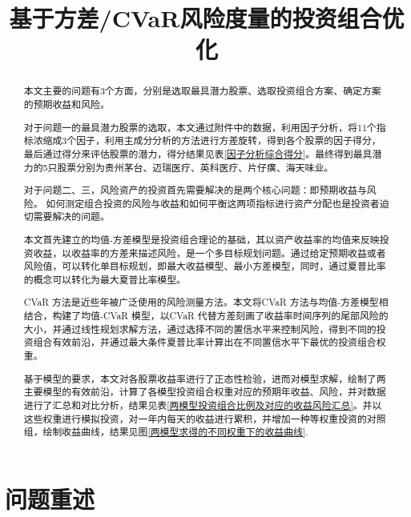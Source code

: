 \documentclass[withoutpreface,bwprint]{cumcmthesis} %
\title{基于方差/CVaR风险度量的投资组合优化}
\begin{document}
	
	\maketitle

	\begin{abstract}
		本文主要的问题有3个方面，分别是选取最具潜力股票、选取投资组合方案、确定方案的预期收益和风险。
		
		对于问题一的最具潜力股票的选取，本文通过附件中的数据，利用因子分析，将11个指标浓缩成3个因子，利用主成分分析的方法进行方差旋转，得到各个股票的因子得分，最后通过得分来评估股票的潜力，得分结果见表\ref{因子分析综合得分}。最终得到最具潜力的5只股票分别为贵州茅台、迈瑞医疗、英科医疗、片仔癀、海天味业。
		
		对于问题二、三，风险资产的投资首先需要解决的是两个核心问题：即预期收益与风险。 如何测定组合投资的风险与收益和如何平衡这两项指标进行资产分配也是投资者迫切需要解决的问题。
		
		本文首先建立的均值-方差模型是投资组合理论的基础，其以资产收益率的均值来反映投资收益，以收益率的方差来描述风险，是一个多目标规划问题。通过给定预期收益或者风险值，可以转化单目标规划，即最大收益模型、最小方差模型，同时，通过夏普比率的概念可以转化为最大夏普比率模型。
		
		CVaR 方法是近些年被广泛使用的风险测量方法。本文将CVaR 方法与均值-方差模型相结合，构建了均值-CVaR 模型，以CVaR 代替方差刻画了收益率时间序列的尾部风险的大小，并通过线性规划求解方法，通过选择不同的置信水平来控制风险，得到不同的投资组合有效前沿，并通过最大条件夏普比率计算出在不同置信水平下最优的投资组合权重。
		
		基于模型的要求，本文对各股票收益率进行了正态性检验，进而对模型求解，绘制了两主要模型的有效前沿，计算了各模型投资组合权重对应的预期年收益、风险，并对数据进行了汇总和对比分析，结果见表\ref{两模型投资组合比例及对应的收益风险汇总}。并以这些权重进行模拟投资，对一年内每天的收益进行累积，并增加一种等权重投资的对照组，绘制收益曲线，结果见图\ref{两模型求得的不同权重下的收益曲线}.
		
		
	\end{abstract}
	
	\tableofcontents
	
	
	\section{问题重述}
\end{document}
